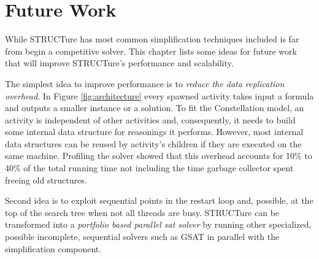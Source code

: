 \chapter{Future Work}
\label{chap:future}

While STRUCTure has most common simplification techniques included
is far from begin a competitive solver. This chapter lists some
ideas for future work that will improve STRUCTure's performance
and scalability.

The simplest idea to improve performance is to \emph{reduce the
data replication overhead}. In Figure \ref{fig:architecture}
every spawned activity takes input a formula and outputs a
smaller instance or a solution. To fit the Constellation model,
an activity is independent of other activities and, consequently,
it needs to build some internal data structure for reasonings it
performs. However, most internal data structures can be reused
by activity's children if they are executed on the same machine.
Profiling the solver showed that this overhead accounts for 10\%
to 40\% of the total running time not including the time garbage
collector spent freeing old structures.

Second idea is to exploit sequential points in the restart loop
and, possible, at the top of the search tree when not all threads
are busy. STRUCTure can be transformed into a \emph{portfolio
based parallel sat solver} \cite{5547119} by running other
specialized, possible incomplete, sequential solvers such as GSAT
\cite{Selman92anew} in parallel with the simplification component.



